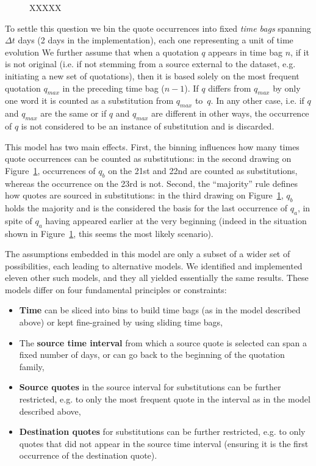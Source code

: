 \begin{figure}[h]
    \centering
    \def\svgwidth{\linewidth}
    \small
    
    \caption{XXXXX}
    \label{fig:substitution-detection-example1}
\end{figure}

To settle this question we bin the quote occurrences into fixed \emph{time bags} spanning $\Delta t$ days (2 days in the implementation), each one representing a unit of time evolution
We further assume that when a quotation $q$ appears in time bag $n$, if it is not original (i.e. if not stemming from a source external to the dataset, e.g. initiating a new set of quotations), then it is based solely on the most frequent quotation $q_{max}$ in the preceding time bag ($n - 1$).
If $q$ differs from $q_{max}$ by only one word it is counted as a substitution from $q_{max}$ to~$q$.
In any other case, i.e. if $q$ and $q_{max}$ are the same or if $q$ and $q_{max}$ are different in other ways, the occurrence of $q$ is not considered to be an instance of substitution and is discarded.

This model has two main effects.
First, the binning influences how many times quote occurrences can be counted as substitutions: in the second drawing on Figure~\ref{fig:substitution-detection-example1}, occurrences of $q_b$ on the 21st and 22nd are counted as substitutions, whereas the occurrence on the 23rd is not.
Second, the ``majority'' rule defines how quotes are sourced in substitutions: in the third drawing on Figure~\ref{fig:substitution-detection-example1}, $q_b$ holds the majority and is the considered the basis for the last occurrence of $q_a$, in spite of $q_a$ having appeared earlier at the very beginning (indeed in the situation shown in Figure~\ref{fig:substitution-detection-example1}, this seems the most likely scenario).

The assumptions embedded in this model are only a subset of a wider set of possibilities, each leading to alternative models.
We identified and implemented eleven other such models, and they all yielded essentially the same results.
These models differ on four fundamental principles or constraints:

\begin{itemize}
    \item \textbf{Time} can be sliced into bins to build time bags (as in the model described above) or kept fine-grained by using sliding time bags,
    \item The \textbf{source time interval} from which a source quote is selected can span a fixed number of days, or can go back to the beginning of the quotation family,
    \item \textbf{Source quotes} in the source interval for substitutions can be further restricted, e.g. to only the most frequent quote in the interval as in the model described above,
    \item \textbf{Destination quotes} for substitutions can be further restricted, e.g. to only quotes that did not appear in the source time interval (ensuring it is the first occurrence of the destination quote).
\end{itemize}

